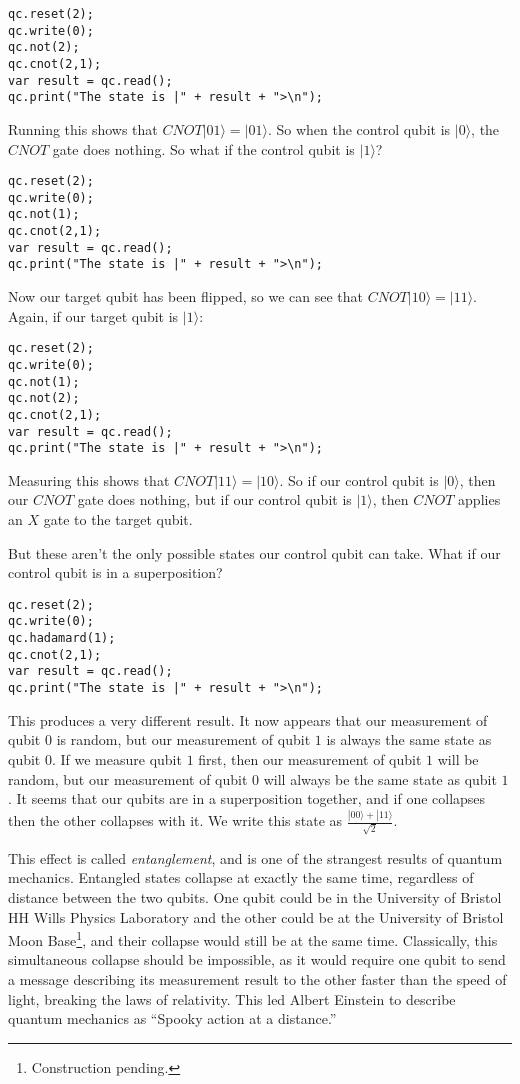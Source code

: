 \documentclass[twocolumn]{article}
\begin{document}
\begin{lstlisting}
qc.reset(2);
qc.write(0);
qc.not(2);
qc.cnot(2,1);
var result = qc.read();
qc.print("The state is |" + result + ">\n");
\end{lstlisting}

Running this shows that $CNOT|01\rangle = |01\rangle$. So when the control qubit is $|0\rangle$, the $CNOT$ gate does nothing. So what if the control qubit is $|1\rangle$?

\begin{lstlisting}
qc.reset(2);
qc.write(0);
qc.not(1);
qc.cnot(2,1);
var result = qc.read();
qc.print("The state is |" + result + ">\n");
\end{lstlisting}

Now our target qubit has been flipped, so we can see that $CNOT|10\rangle = |11\rangle$. Again, if our target qubit is $|1\rangle$:

\begin{lstlisting}
qc.reset(2);
qc.write(0);
qc.not(1);
qc.not(2);
qc.cnot(2,1);
var result = qc.read();
qc.print("The state is |" + result + ">\n");
\end{lstlisting}

Measuring this shows that $CNOT|11\rangle = |10\rangle$. So if our control qubit is $|0\rangle$, then our $CNOT$ gate does nothing, but if our control qubit is $|1\rangle$, then $CNOT$ applies an $X$ gate to the target qubit.

But these aren't the only possible states our control qubit can take. What if our control qubit is in a superposition?

\begin{lstlisting}
qc.reset(2);
qc.write(0);
qc.hadamard(1);
qc.cnot(2,1);
var result = qc.read();
qc.print("The state is |" + result + ">\n");
\end{lstlisting}

This produces a very different result. It now appears that our measurement of qubit $0$ is random, but our measurement of qubit $1$ is always the same state as qubit $0$. If we measure qubit $1$ first, then our measurement of qubit $1$ will be random, but our measurement of qubit $0$ will always be the same state as qubit $1$. It seems that our qubits are in a superposition together, and if one collapses then the other collapses with it. We write this state as $\frac{|00\rangle + |11\rangle}{\sqrt{2}}$.

This effect is called {\em entanglement}, and is one of the strangest results of quantum mechanics. Entangled states collapse at exactly the same time, regardless of distance between the two qubits. One qubit could be in the University of Bristol HH Wills Physics Laboratory and the other could be at the University of Bristol Moon Base\footnote{Construction pending.}, and their collapse would still be at the same time. Classically, this simultaneous collapse should be impossible, as it would require one qubit to send a message describing its measurement result to the other faster than the speed of light, breaking the laws of relativity. This led Albert Einstein to describe quantum mechanics as ``Spooky action at a distance.''
\end{document}
